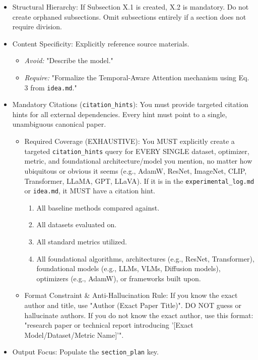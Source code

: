 \begin{itemize}
    \item Structural Hierarchy: If Subsection X.1 is created, X.2 is mandatory. Do not create orphaned subsections. Omit subsections entirely if a section does not require division.
    \item Content Specificity: Explicitly reference source materials. 
    \begin{itemize}
        \item \textit{Avoid:} "Describe the model."
        \item \textit{Require:} "Formalize the Temporal-Aware Attention mechanism using Eq. 3 from \texttt{idea.md}."
    \end{itemize}
    \item Mandatory Citations (\texttt{citation\_hints}): You must provide targeted citation hints for all external dependencies. Every hint must point to a single, unambiguous canonical paper. 
    \begin{itemize}
        \item Required Coverage (EXHAUSTIVE): You MUST explicitly create a targeted \texttt{citation\_hints} query for EVERY SINGLE dataset, optimizer, metric, and foundational architecture/model you mention, no matter how ubiquitous or obvious it seems (e.g., AdamW, ResNet, ImageNet, CLIP, Transformer, LLaMA, GPT, LLaVA). If it is in the \texttt{experimental\_log.md} or \texttt{idea.md}, it MUST have a citation hint.
        \begin{enumerate}
            \item All baseline methods compared against.
            \item All datasets evaluated on.
            \item All standard metrics utilized.
            \item All foundational algorithms, architectures (e.g., ResNet, Transformer), foundational models (e.g., LLMs, VLMs, Diffusion models), optimizers (e.g., AdamW), or frameworks built upon.
        \end{enumerate}
        \item Format Constraint \& Anti-Hallucination Rule: If you know the exact author and title, use "Author (Exact Paper Title)". DO NOT guess or hallucinate authors. If you do not know the exact author, use this format: "research paper or technical report introducing '[Exact Model/Dataset/Metric Name]'".
    \end{itemize}
    \item Output Focus: Populate the \texttt{section\_plan} key.
\end{itemize}

